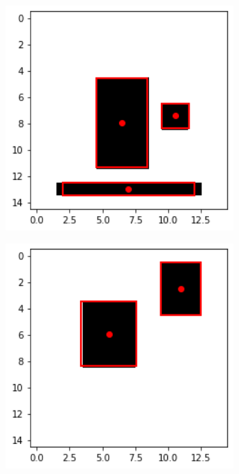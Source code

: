 \begin{figure}[htbp]
    \centering
    \begin{subfigure}{0.32\textwidth}
        \centering
        \includegraphics[width=0.95\textwidth]{images/faceDetec/loss-function/rectangle-prediction-1.png}
    \end{subfigure}
    \hfill
    \begin{subfigure}{0.32\textwidth}
        \centering
        \includegraphics[width=0.95\textwidth]{images/faceDetec/loss-function/rectangle-prediction-2.png}

\end{subfigure}
\end{figure}
